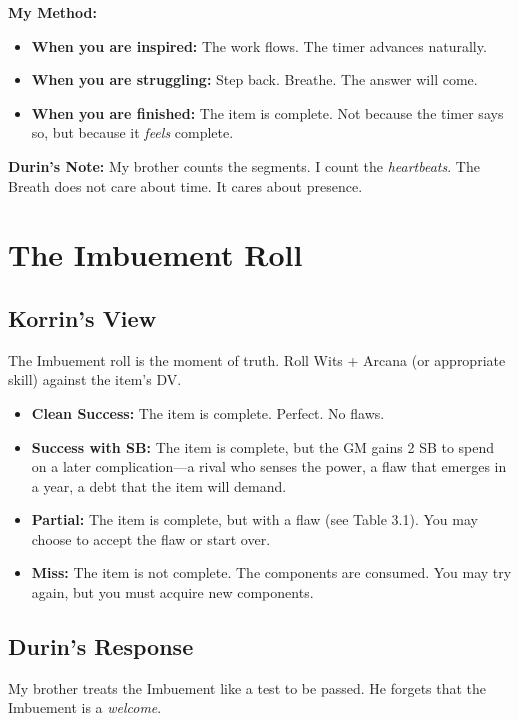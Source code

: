 \documentclass[11pt]{book}
\begin{document}
\textbf{My Method:}
\begin{itemize}
    \item \textbf{When you are inspired:} The work flows. The timer advances naturally.
    \item \textbf{When you are struggling:} Step back. Breathe. The answer will come.
    \item \textbf{When you are finished:} The item is complete. Not because the timer says so, but because it \textit{feels} complete.
\end{itemize}

\vspace{0.5cm}
\textbf{Durin's Note:} My brother counts the segments. I count the \textit{heartbeats}. The Breath does not care about time. It cares about presence.

\newpage
\section{The Imbuement Roll}

\subsection*{Korrin's View}

The Imbuement roll is the moment of truth. Roll Wits + Arcana (or appropriate skill) against the item's DV.

\begin{itemize}
    \item \textbf{Clean Success:} The item is complete. Perfect. No flaws.
    \item \textbf{Success with SB:} The item is complete, but the GM gains 2 SB to spend on a later complication---a rival who senses the power, a flaw that emerges in a year, a debt that the item will demand.
    \item \textbf{Partial:} The item is complete, but with a flaw (see Table 3.1). You may choose to accept the flaw or start over.
    \item \textbf{Miss:} The item is not complete. The components are consumed. You may try again, but you must acquire new components.
\end{itemize}

\subsection*{Durin's Response}

My brother treats the Imbuement like a test to be passed. He forgets that the Imbuement is a \textit{welcome}.
\end{document}
